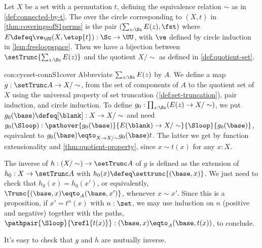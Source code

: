 \begin{construction}\label{con:cycset-connS1cover}
Let $X$ be a set with a permutation $t$, defining the equivalence
relation $\sim$ as in \cref{def:connected-by-t}.
The \covering over the circle corresponding to $(X,t)$ in
\cref{thm:coveringsofS1perms} is the pair $(\sum_{z:\Sc} E(z),\fst)$
where $E\defeq\ve_\UU(X,\etop{t}) : \Sc\to\UU$, with $\ve$ defined by
circle induction in \cref{lem:freeloopspace}.
Then we have a bijection between $\setTrunc{\sum_{z:\Sc} E(z)}$ and
the quotient $X/\sim$ as defined in \cref{def:quotient-set}.
\end{construction}
\begin{implementation}{con:cycset-connS1cover}
Abbreviate $\sum_{z:\Sc} E(z)$ by $A$. We define a map
$g : \setTrunc A \to X/\sim$, from the set of components of $A$
to the quotient set of $X$ using the universal property of set
truncation (\cref{def:set-truncation}), pair induction, and circle induction.
To define $g_0 : \prod_{z:\Sc}(E(z) \to X/\sim)$, we put
$g_0(\base)\defeq[\blank] : X \to X/\sim$ and need
$g_0(\Sloop) : \pathover{g_0(\base)}{E(\blank) \to X/\sim}{\Sloop}{g_0(\base)}$,
equivalent to $g_0(\base) \eqto_{X \to X/\sim} g_0(\base)t$.
The latter we get by function extensionality and \cref{thm:quotient-property},
since $x \sim t(x)$ for any $x:X$.

  The inverse of $h:(X/\sim) \to \setTrunc A$ of $g$
  is defined as the extension of $h_0 : X \to \setTrunc A$
  with $h_0(x) \defeq \settrunc{(\base,x)}$.
  We just need to check that $h_0(x) = h_0(x')$, or equivalently,
  $\Trunc{(\base,x)\eqto_A(\base,x')}$, whenever $x\sim x'$.
  Since this is a proposition, if $x'=t^n(x)$ with $n:\zet$,
  we may use induction on $n$ (positive and negative)
  together with the paths,
  $\pathpair{\Sloop}{\refl{t(x)}} : (\base,x)\eqto_A(\base,t(x))$,
  to conclude.

  It's easy to check that $g$ and $h$ are mutually inverse.
\end{implementation}

